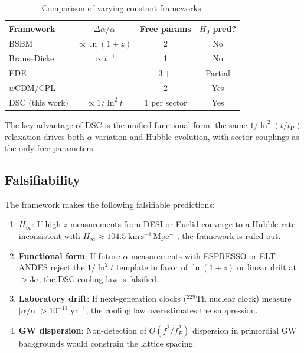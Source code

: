 \documentclass[twocolumn,showpacs,preprintnumbers,amsmath,amssymb,prd]{revtex4-2}
\newcommand{\lnq}{\ln^2}
\newcommand{\tP}{t_{\mathrm{P}}}
\newcommand{\Hinf}{H_{\infty}}
\begin{document}
\begin{table}[h]
\caption{Comparison of varying-constant frameworks.}
\label{tab:compare}
\begin{ruledtabular}
\begin{tabular}{lccc}
 Framework & $\Delta\alpha/\alpha$ & Free params & $H_0$ pred? \\
\hline
BSBM~\cite{Sandvik2002} & $\propto\ln(1+z)$ & 2 & No \\
Brans--Dicke~\cite{BransDicke1961} & $\propto t^{-1}$ & 1 & No \\
EDE~\cite{Poulin2019} & --- & $3+$ & Partial \\
$w$CDM/CPL & --- & 2 & Yes \\
DSC (this work) & $\propto 1/\lnq t$ & 1 per sector & Yes \\
\end{tabular}
\end{ruledtabular}
\end{table}

The key advantage of DSC is the unified functional form: the same
$1/\lnq(t/\tP)$ relaxation drives both $\alpha$ variation and
Hubble evolution, with sector couplings as the only free
parameters.

\subsection{Falsifiability}
\label{sec:falsify}

The framework makes the following falsifiable predictions:

\begin{enumerate}
  \item \textbf{$\Hinf$}: If high-$z$ measurements from DESI or
    Euclid converge to a Hubble rate inconsistent with
    $\Hinf \approx 104.5\;\mathrm{km\,s^{-1}\,Mpc^{-1}}$, the
    framework is ruled out.
  \item \textbf{Functional form}: If future $\alpha$ measurements
    with ESPRESSO or ELT-ANDES reject the $1/\lnq t$ template in
    favor of $\ln(1+z)$ or linear drift at $>3\sigma$, the DSC
    cooling law is falsified.
  \item \textbf{Laboratory drift}: If next-generation clocks
    ($^{229}$Th nuclear clock) measure
    $|\dot\alpha/\alpha| > 10^{-14}\;\mathrm{yr}^{-1}$, the
    cooling law overestimates the suppression.
  \item \textbf{GW dispersion}: Non-detection of $O(f^2/f_P^2)$
    dispersion in primordial GW backgrounds would constrain the
    lattice spacing.
\end{enumerate}
\end{document}
